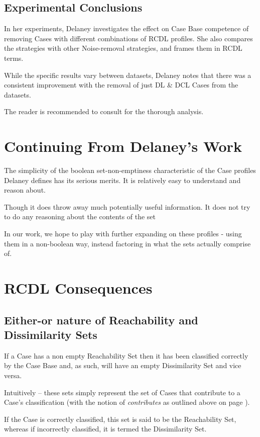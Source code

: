 \documentclass[a4paper,11pt]{report}
\begin{document}
\subsection{Experimental Conclusions}
In her experiments, Delaney investigates the effect on Case Base competence of removing Cases with different combinations of RCDL profiles. She also compares the strategies with other Noise-removal strategies, and frames them in RCDL terms.

While the specific results vary between datasets, Delaney notes that there was a consistent improvement with the removal of just DL \& DCL Cases from the datasets. 

The reader is recommended to consult \citet{Delany2009} for the thorough analysis.

\section{Continuing From Delaney's Work}
The simplicity of the boolean set-non-emptiness characteristic of the Case profiles Delaney defines has its serious merits. It is relatively easy to understand and reason about. 

Though it does throw away much potentially useful information. It does not try to do any reasoning about the contents of the set

In our work, we hope to play with further expanding on these profiles - using them in a non-boolean way, instead factoring in what the sets actually comprise of.

\section{RCDL Consequences}

\subsection{Either-or nature of Reachability and Dissimilarity Sets}
If a Case has a non empty Reachability Set then it has been classified correctly by the Case Base and, as such, will have an empty Dissimilarity Set and vice versa.

Intuitively – these sets simply represent the set of Cases that contribute to a Case's classification (with the notion of \emph{contributes} as outlined above on page \pageref{sec:contributes}). 

If the Case is correctly classified, this set is said to be the Reachability Set, whereas if incorrectly classified, it is termed the Dissimilarity Set.
\end{document}
